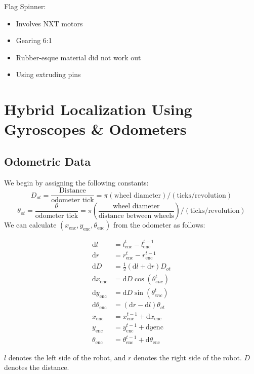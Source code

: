 \documentclass{article}
\begin{document}
Flag Spinner:
\begin{itemize}
\item Involves NXT motors
\item Gearing 6:1
\item Rubber-esque material did not work out
\item Using extruding pins
\end{itemize}

\newpage
\section{Hybrid Localization Using Gyroscopes \& Odometers}
\subsection{Odometric Data}
We begin by assigning the following constants: 
\[D_{ot}=\frac{\text{Distance}}{\text{odometer tick}}=\pi(\text{wheel diameter})/(\text{ticks/revolution})\]\[ \theta_{ot} = \frac{\theta}{\text{odometer tick}} = \pi\left(\frac{\text{wheel diameter}}{\text{distance between wheels}}\right)/(\text{ticks/revolution})\]
We can calculate $(x_{\mathrm{enc}}, y_{\mathrm{enc}}, \theta_{\mathrm{enc}})$ from the odometer as follows: 
\begin{center}
	\begin{align}
		\mathrm{d}l &= l^t_{\mathrm{enc}}-l^{t-1}_{\mathrm{enc}} \\
		\mathrm{d}r &= r^t_{\mathrm{enc}}-r^{t-1}_{\mathrm{enc}} \\
		\mathrm{d}D &= \frac{1}{2}(\mathrm{d}l+\mathrm{d}r)D_{ot} \\
		\mathrm{d}x_{\mathrm{enc}} &= \mathrm{d}D\cos(\theta^t_{enc}) \\
		\mathrm{d}y_{\mathrm{enc}} &= \mathrm{d}D\sin(\theta^t_{enc}) \\
		\mathrm{d}\theta_{\mathrm{enc}} &= (\mathrm{d}r-\mathrm{d}l)\theta_{ot} \\
		x_{\mathrm{enc}} &= x^{t-1}_{\mathrm{enc}} + \mathrm{d}x_{\mathrm{enc}} \\
		y_{\mathrm{enc}} &= y^{t-1}_{\mathrm{enc}} + \mathrm{d}y{\mathrm{enc}} \\
		\theta_{\mathrm{enc}} &= \theta^{t-1}_{\mathrm{enc}} + \mathrm{d}\theta_{\mathrm{enc}}
	\end{align}
\end{center}

$l$ denotes the left side of the robot, and $r$ denotes the right side of the robot. $D$ denotes the distance. 
\end{document}
